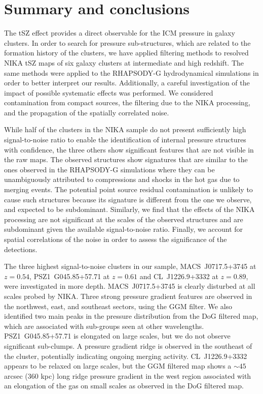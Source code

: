 \documentclass[twocolumn,traditabstract]{aa}
\begin{document}
\section{Summary and conclusions}\label{sec:Summary_and_conclusions}
The tSZ effect provides a direct observable for the ICM pressure in galaxy clusters. In order to search for pressure sub-structures, which are related to the formation history of the clusters, we have applied filtering methods to resolved NIKA tSZ maps of six galaxy clusters at intermediate and high redshift. The same methods were applied to the RHAPSODY-G hydrodynamical simulations in order to better interpret our results. Additionally, a careful investigation of the impact of possible systematic effects was performed. We considered contamination from compact sources, the filtering due to the NIKA processing, and the propagation of the spatially correlated noise.

While half of the clusters in the NIKA sample do not present sufficiently high signal-to-noise ratio to enable the identification of internal pressure structures with confidence, the three others show significant features that are not visible in the raw maps. The observed structures show signatures that are similar to the ones observed in the RHAPSODY-G simulations where they can be unambiguously attributed to compressions and shocks in the hot gas due to merging events. The potential point source residual contamination is unlikely to cause such structures because its signature is different from the one we observe, and expected to be subdominant. Similarly, we find that the effects of the NIKA processing are not significant at the scales of the observed structures and are subdominant given the available signal-to-noise ratio. Finally, we account for spatial correlations of the noise in order to assess the significance of the detections.

The three highest signal-to-noise clusters in our sample, \mbox{MACS~J0717.5+3745} at $z=0.54$, \mbox{PSZ1~G045.85+57.71} at $z=0.61$ and \mbox{CL~J1226.9+3332} at $z=0.89$, were investigated in more depth. \mbox{MACS~J0717.5+3745} is clearly disturbed at all scales probed by NIKA. Three strong pressure gradient features are observed in the northwest, east, and southeast sectors, using the GGM filter. We also identified two main peaks in the pressure distribution from the DoG filtered map, which are associated with sub-groups seen at other wavelengths. \mbox{PSZ1~G045.85+57.71} is elongated on large scales, but we do not observe significant sub-clumps. A pressure gradient ridge is observed in the southeast of the cluster, potentially indicating ongoing merging activity. \mbox{CL~J1226.9+3332} appears to be relaxed on large scales, but the GGM filtered map shows a $\sim 45$ arcsec (360 kpc) long ridge pressure gradient in the west region associated with an elongation of the gas on small scales as observed in the DoG filtered map.
\end{document}
